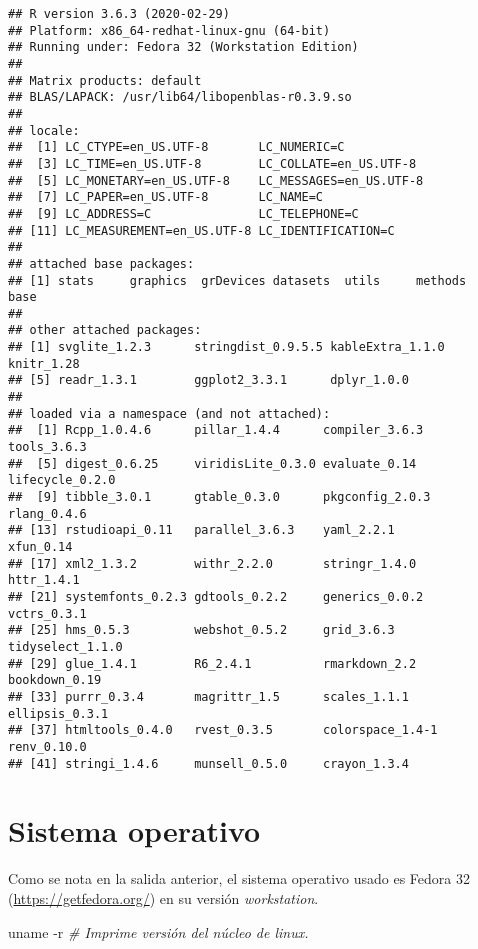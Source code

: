 \documentclass[
]{book}
\newenvironment{Shaded}{\begin{snugshade}}{\end{snugshade}}
\newcommand{\CommentTok}[1]{\textcolor[rgb]{0.56,0.35,0.01}{\textit{#1}}}
\newcommand{\FunctionTok}[1]{\textcolor[rgb]{0.00,0.00,0.00}{#1}}
\newcommand{\NormalTok}[1]{#1}
\begin{document}
\begin{verbatim}
## R version 3.6.3 (2020-02-29)
## Platform: x86_64-redhat-linux-gnu (64-bit)
## Running under: Fedora 32 (Workstation Edition)
## 
## Matrix products: default
## BLAS/LAPACK: /usr/lib64/libopenblas-r0.3.9.so
## 
## locale:
##  [1] LC_CTYPE=en_US.UTF-8       LC_NUMERIC=C              
##  [3] LC_TIME=en_US.UTF-8        LC_COLLATE=en_US.UTF-8    
##  [5] LC_MONETARY=en_US.UTF-8    LC_MESSAGES=en_US.UTF-8   
##  [7] LC_PAPER=en_US.UTF-8       LC_NAME=C                 
##  [9] LC_ADDRESS=C               LC_TELEPHONE=C            
## [11] LC_MEASUREMENT=en_US.UTF-8 LC_IDENTIFICATION=C       
## 
## attached base packages:
## [1] stats     graphics  grDevices datasets  utils     methods   base     
## 
## other attached packages:
## [1] svglite_1.2.3      stringdist_0.9.5.5 kableExtra_1.1.0   knitr_1.28        
## [5] readr_1.3.1        ggplot2_3.3.1      dplyr_1.0.0       
## 
## loaded via a namespace (and not attached):
##  [1] Rcpp_1.0.4.6      pillar_1.4.4      compiler_3.6.3    tools_3.6.3      
##  [5] digest_0.6.25     viridisLite_0.3.0 evaluate_0.14     lifecycle_0.2.0  
##  [9] tibble_3.0.1      gtable_0.3.0      pkgconfig_2.0.3   rlang_0.4.6      
## [13] rstudioapi_0.11   parallel_3.6.3    yaml_2.2.1        xfun_0.14        
## [17] xml2_1.3.2        withr_2.2.0       stringr_1.4.0     httr_1.4.1       
## [21] systemfonts_0.2.3 gdtools_0.2.2     generics_0.0.2    vctrs_0.3.1      
## [25] hms_0.5.3         webshot_0.5.2     grid_3.6.3        tidyselect_1.1.0 
## [29] glue_1.4.1        R6_2.4.1          rmarkdown_2.2     bookdown_0.19    
## [33] purrr_0.3.4       magrittr_1.5      scales_1.1.1      ellipsis_0.3.1   
## [37] htmltools_0.4.0   rvest_0.3.5       colorspace_1.4-1  renv_0.10.0      
## [41] stringi_1.4.6     munsell_0.5.0     crayon_1.3.4
\end{verbatim}

\hypertarget{sistema-operativo}{%
\section{Sistema operativo}\label{sistema-operativo}}

Como se nota en la salida anterior, el sistema operativo usado es Fedora 32 (\url{https://getfedora.org/}) en su versión \emph{workstation}.

\begin{Shaded}
\begin{Highlighting}[]
\FunctionTok{uname}\NormalTok{ {-}r }\CommentTok{\# Imprime versión del núcleo de linux.}
\end{Highlighting}
\end{Shaded}
\end{document}
